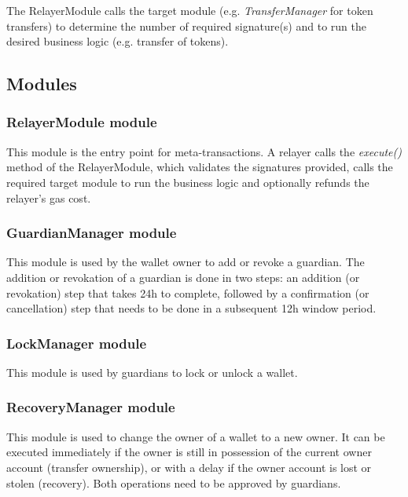 \documentclass[12pt]{article}
\begin{document}
The RelayerModule calls the target module (e.g. \emph{TransferManager} for token transfers) to determine the number of required signature(s) and to run the desired business logic (e.g. transfer of tokens).

\subsection{Modules}

\subsubsection{RelayerModule module}

This module is the entry point for meta-transactions. A relayer calls the \emph{execute()} method of the RelayerModule, which validates the signatures provided, calls the required target module to run the business logic and optionally refunds the relayer's gas cost.

\subsubsection{GuardianManager module}

This module is used by the wallet owner to add or revoke a guardian. The addition or revokation of a guardian is done in two steps: an addition (or revokation) step that takes 24h to complete, followed by a confirmation (or cancellation) step that needs to be done in a subsequent 12h window period.

\subsubsection{LockManager module}

This module is used by guardians to lock or unlock a wallet.

\subsubsection{RecoveryManager module}

This module is used to change the owner of a wallet to a new owner. It can be executed immediately if the owner is still in possession of the current owner account (transfer ownership), or with a delay if the owner account is lost or stolen (recovery). Both operations need to be approved by guardians.
\end{document}
